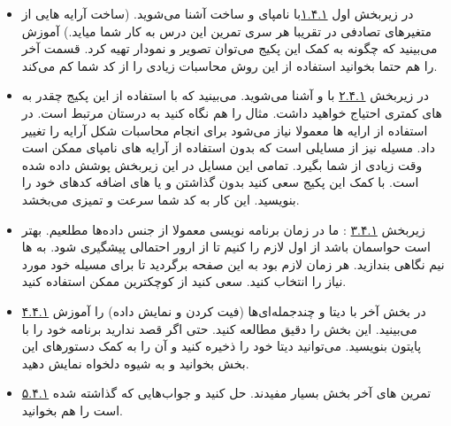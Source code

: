 \documentclass[11pt, a4paper]{article}
\begin{document}
\begin{itemize}[label=\Large $\bullet$]
	\item 
	در زیربخش اول \href{https://scipy-lectures.org/intro/numpy/array_object.html}{ ۱.۴.۱}با نامپای و ساخت  آشنا می‌شوید.
	(ساخت آرایه هایی از متغیرهای تصادفی در تقریبا هر سری تمرین این درس به کار شما میاید.) 
	آموزش می‌بینید که چگونه به کمک این پکیج می‌توان تصویر و نمودار تهیه کرد. 
	قسمت آخر  را هم حتما بخوانید استفاده از این روش محاسبات زیادی را از کد شما کم می‌کند.
	
	\item
	در زیربخش \href{https://scipy-lectures.org/intro/numpy/operations.html}{ ۲.۴.۱}
با  و  آشنا می‌شوید. 
می‌بینید که با استفاده از این پکیج چقدر به  های کمتری احتیاج خواهید داشت. 
مثال  را هم نگاه کنید به درستان مرتبط است. 
در استفاده از ارایه ها معمولا نیاز می‌شود برای انجام محاسبات شکل آرایه را تغییر داد. 
مسیله  نیز از مسایلی است که بدون استفاده از آرایه های نامپای ممکن است وقت زیادی از شما بگیرد. 
تمامی این مسایل در این زیربخش پوشش داده شده است.
 با کمک این پکیج سعی کنید بدون گذاشتن  و یا  های اضافه کدهای خود را بنویسید.
  این کار به کد شما سرعت و تمیزی می‌بخشد.

\item
  زیربخش \href{https://scipy-lectures.org/intro/numpy/elaborate_arrays.html}{ ۳.۴.۱}
: ما در زمان برنامه نویسی معمولا از جنس داده‌ها مطلعیم. 
بهتر است حواسمان باشد از اول  لازم را  کنیم تا از ارور احتمالی پیشگیری شود.
 به  ها نیم نگاهی بندازید. هر زمان لازم بود به این صفحه برگردید تا برای مسیله خود  مورد نیاز را انتخاب کنید.
  سعی کنید از کوچکترین  ممکن استفاده کنید.

\item 
\href{https://scipy-lectures.org/intro/numpy/advanced_operations.html}{۴.۴.۱}
در بخش آخر با دیتا و چندجمله‌ای‌ها (فیت کردن و نمایش داده) را آموزش می‌بینید. 
این بخش را دقیق مطالعه کنید. حتی اگر قصد ندارید برنامه خود را با پایتون بنویسید.
 می‌توانید دیتا خود را ذخیره کنید و آن را به کمک دستورهای این بخش بخوانید و به شیوه دلخواه نمایش دهید.

\item
\href{https://scipy-lectures.org/intro/numpy/exercises.html}{۵.۴.۱}
تمرین های آخر بخش بسیار مفیدند.  حل کنید و جواب‌هایی که گذاشته شده است را هم بخوانید.

\end{itemize}
\end{document}
